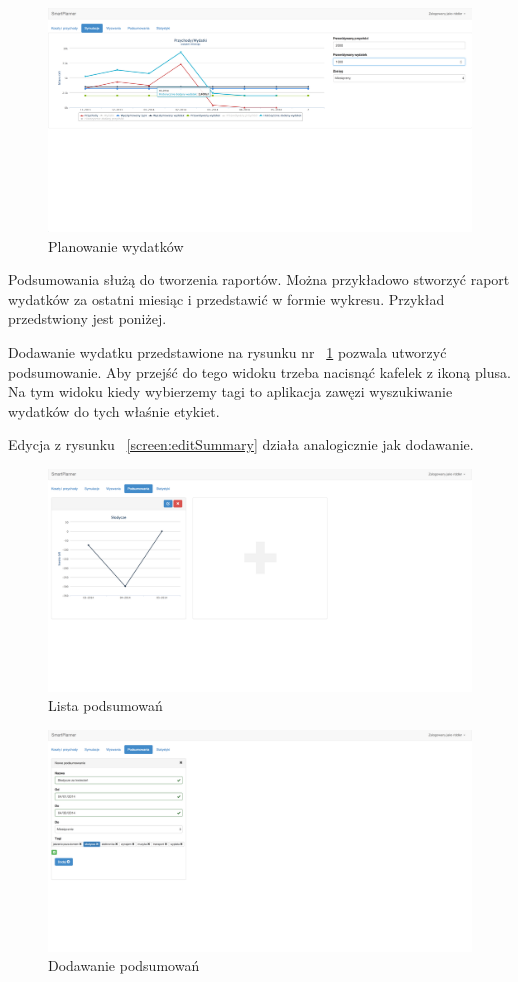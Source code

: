 \documentclass[10pt,titlepage]{article}
\begin{document}
\begin{figure}[H]
  \centering
  \includegraphics[scale=0.2]{images/screen_planowanieWydatkow.png}
  \caption{Planowanie wydatków}
\end{figure}
\par Podsumowania służą do tworzenia raportów. Można przykładowo stworzyć raport wydatków za ostatni miesiąc i przedstawić w formie wykresu. Przykład przedstwiony jest poniżej.
\par Dodawanie wydatku przedstawione na rysunku nr ~\ref{screen:addSummary} pozwala utworzyć podsumowanie. Aby przejść do tego widoku trzeba nacisnąć kafelek z ikoną plusa. Na tym widoku kiedy wybierzemy tagi to aplikacja zawęzi wyszukiwanie wydatków do tych właśnie etykiet.
\par Edycja z rysunku ~\ref{screen:editSummary} działa analogicznie jak dodawanie.
\begin{figure}[H]
  \centering
  \includegraphics[scale=0.2]{images/screen_podsumowania.png}
  \caption{Lista podsumowań}
\end{figure}
\begin{figure}[H]
  \centering
  \includegraphics[scale=0.2]{images/screen_podsumowaniaDodaj.png}
  \caption{Dodawanie podsumowań}
  \label{screen:addSummary}
\end{figure}
\end{document}
